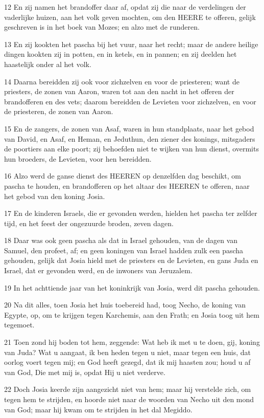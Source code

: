 \par 12 En zij namen het brandoffer daar af, opdat zij die naar de verdelingen der vaderlijke huizen, aan het volk geven mochten, om den HEERE te offeren, gelijk geschreven is in het boek van Mozes; en alzo met de runderen.
\par 13 En zij kookten het pascha bij het vuur, naar het recht; maar de andere heilige dingen kookten zij in potten, en in ketels, en in pannen; en zij deelden het haastelijk onder al het volk.
\par 14 Daarna bereidden zij ook voor zichzelven en voor de priesteren; want de priesters, de zonen van Aaron, waren tot aan den nacht in het offeren der brandofferen en des vets; daarom bereidden de Levieten voor zichzelven, en voor de priesteren, de zonen van Aaron.
\par 15 En de zangers, de zonen van Asaf, waren in hun standplaats, naar het gebod van David, en Asaf, en Heman, en Jeduthun, den ziener des konings, mitsgaders de poortiers aan elke poort; zij behoefden niet te wijken van hun dienst, overmits hun broeders, de Levieten, voor hen bereidden.
\par 16 Alzo werd de ganse dienst des HEEREN op denzelfden dag beschikt, om pascha te houden, en brandofferen op het altaar des HEEREN te offeren, naar het gebod van den koning Josia.
\par 17 En de kinderen Israels, die er gevonden werden, hielden het pascha ter zelfder tijd, en het feest der ongezuurde broden, zeven dagen.
\par 18 Daar was ook geen pascha als dat in Israel gehouden, van de dagen van Samuel, den profeet, af; en geen koningen van Israel hadden zulk een pascha gehouden, gelijk dat Josia hield met de priesters en de Levieten, en gans Juda en Israel, dat er gevonden werd, en de inwoners van Jeruzalem.
\par 19 In het achttiende jaar van het koninkrijk van Josia, werd dit pascha gehouden.
\par 20 Na dit alles, toen Josia het huis toebereid had, toog Necho, de koning van Egypte, op, om te krijgen tegen Karchemis, aan den Frath; en Josia toog uit hem tegemoet.
\par 21 Toen zond hij boden tot hem, zeggende: Wat heb ik met u te doen, gij, koning van Juda? Wat u aangaat, ik ben heden tegen u niet, maar tegen een huis, dat oorlog voert tegen mij; en God heeft gezegd, dat ik mij haasten zou; houd u af van God, Die met mij is, opdat Hij u niet verderve.
\par 22 Doch Josia keerde zijn aangezicht niet van hem; maar hij verstelde zich, om tegen hem te strijden, en hoorde niet naar de woorden van Necho uit den mond van God; maar hij kwam om te strijden in het dal Megiddo.
